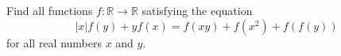 Find all functions $f:\mathbb{R}\to\mathbb{R}$ satisfying the equation \[|x|f(y)+yf(x)=f(xy)+f(x^2)+f(f(y))\]for all real numbers $x$ and $y$.